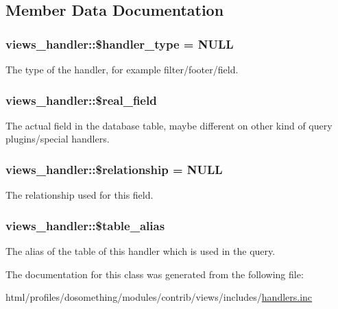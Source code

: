 \subsection{Member Data Documentation}
\hypertarget{classviews__handler_afb557031e6624ae31b4dfa14b4c7cc64}{
\subsubsection[{\$handler\_\-type}]{\setlength{\rightskip}{0pt plus 5cm}views\_\-handler::\$handler\_\-type = NULL}}
\label{classviews__handler_afb557031e6624ae31b4dfa14b4c7cc64}
The type of the handler, for example filter/footer/field. \hypertarget{classviews__handler_a5920055a18e5fd31ac515f990bad81de}{
\subsubsection[{\$real\_\-field}]{\setlength{\rightskip}{0pt plus 5cm}views\_\-handler::\$real\_\-field}}
\label{classviews__handler_a5920055a18e5fd31ac515f990bad81de}
The actual field in the database table, maybe different on other kind of query plugins/special handlers. \hypertarget{classviews__handler_a54677c1b1f0ae2b6df91b99e454a4b45}{
\subsubsection[{\$relationship}]{\setlength{\rightskip}{0pt plus 5cm}views\_\-handler::\$relationship = NULL}}
\label{classviews__handler_a54677c1b1f0ae2b6df91b99e454a4b45}
The relationship used for this field. \hypertarget{classviews__handler_aa894a021af549bd94123702f252d2f12}{
\subsubsection[{\$table\_\-alias}]{\setlength{\rightskip}{0pt plus 5cm}views\_\-handler::\$table\_\-alias}}
\label{classviews__handler_aa894a021af549bd94123702f252d2f12}
The alias of the table of this handler which is used in the query. 

The documentation for this class was generated from the following file:\begin{DoxyCompactItemize}
\item 
html/profiles/dosomething/modules/contrib/views/includes/\hyperlink{handlers_8inc}{handlers.inc}\end{DoxyCompactItemize}
